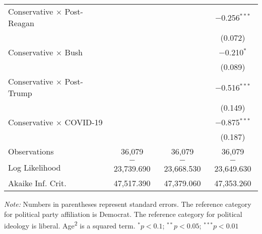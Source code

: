 \begin{ThreePartTable}
\begin{tabularx}{\textwidth}{Xccc}
  Conservative $\times$ Post-Reagan &  &  & $-$0.256$^{***}$ \\ 
  &  &  & (0.072) \\ 
  Conservative $\times$ Bush &  &  & $-$0.210$^{*}$ \\ 
  &  &  & (0.089) \\ 
  Conservative $\times$ Post-Trump &  &  & $-$0.516$^{***}$ \\ 
  &  &  & (0.149) \\ 
  Conservative $\times$ COVID-19 &  &  & $-$0.875$^{***}$ \\ 
  &  &  & (0.187) \\ 
 \midrule  
Observations & 36,079 & 36,079 & 36,079 \\ 
Log Likelihood & $-$23,739.690 & $-$23,668.530 & $-$23,649.630 \\ 
Akaike Inf. Crit. & 47,517.390 & 47,379.060 & 47,353.260 \\ 
\end{tabularx} 
{\it Note:} Numbers in parentheses represent standard errors. The reference category for political party affiliation is Democrat. The reference category for political ideology is liberal. Age\textsuperscript{2} is a squared term. \newline $^{*}p<0.1$; $^{**}p<0.05$; $^{***}p<0.01$
\bigskip 
\end{ThreePartTable} 
